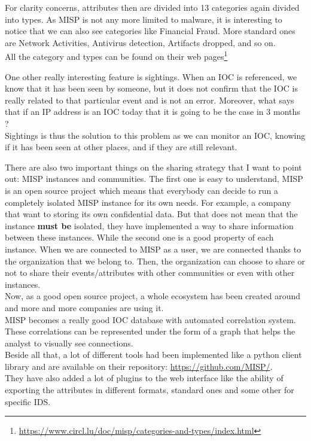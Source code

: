 \documentclass{eplmastersthesis}
\begin{document}
For clarity concerns, attributes then are divided into 13 categories again divided into types. As MISP is not any more limited to malware, it is interesting to notice that we can also see categories like Financial Fraud. More standard ones are Network Activities, Antivirus detection, Artifacts dropped, and so on.\\
All the category and types can be found on their web pages\footnote {\url{https://www.circl.lu/doc/misp/categories-and-types/index.html}}

One other really interesting feature is sightings. When an IOC is referenced, we know that it has been seen by someone, but it does not confirm that the IOC is really related to that particular event and is not an error. Moreover, what says that if an IP address is an IOC today that it is going to be the case in 3 months ? \\
Sightings is thus the solution to this problem as we can monitor an IOC, knowing if it has been seen at other places, and if they are still relevant.


There are also two important things on the sharing strategy that I want to point out: MISP instances and communities. The first one is easy to understand, MISP is an open source project which means that everybody can decide to run a completely isolated MISP instance for its own needs. For example, a company that want to storing its own confidential data. But that does not mean that the instance \textbf{must be} isolated, they have implemented a way to share information between these instances. While the second one is a good property of each instance. When we are connected to MISP as a user, we are connected thanks to the organization that we belong to. Then, the organization can choose to share or not to share their events/attributes with other communities or even with other instances. \\ 

Now, as a good open source project, a whole ecosystem has been created around and more and more companies are using it.\\
MISP becomes a really good IOC database with automated correlation system. These correlations can be represented under the form of a graph that helps the analyst to visually see connections.\\
Beside all that, a lot of different tools had been implemented like a python client library and are available on their repository: \url{https://github.com/MISP/}.\\
They have also added a lot of plugins to the web interface like the ability of exporting the attributes in different formats, standard ones and some other for specific IDS.\\
\end{document}
